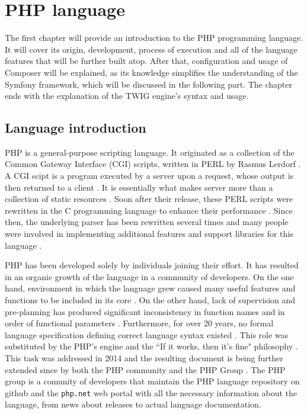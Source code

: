 \chapter{PHP language}
The first chapter will provide an introduction to the PHP programming language. It will cover its origin, development, process of execution and all of the language features that will be further built atop. After that, configuration and usage of Composer will be explained, as its knowledge simplifies the understanding of the Symfony framework, which will be discussed in the following part. The chapter ends with the explanation of the TWIG engine's syntax and usage. 

\section{Language introduction}
PHP is a general-purpose scripting language. It originated as a collection of the Common Gateway Interface (CGI) scripts, written in PERL by Rasmus Lerdorf \citep{modern.php}. A CGI scipt is a program executed by a server upon a request, whose output is then returned to a client \citep{cgi.perl}. It is essentially what makes server more than a collection of static resources \citep{cgi.perl}. Soon after their release, these PERL scripts were rewritten in the C programming language to enhance their performance \citep{modern.php}. Since then, the underlying parser has been rewritten several times and many people were involved in implementing additional features and support libraries for this language \citep{php.manual}. 

PHP has been developed solely by individuals joining their effort. It has resulted in an organic growth of the language in a community of developers. On the one hand, environment in which the language grew caused many useful features and functions to be included in its core \citep{php.manual}. On the other hand, lack of supervision and pre-planning has produced significant inconsistency in function names and in order of functional parameters \citep{php.manual}. Furthermore, for over 20 years, no formal language specification defining correct language syntax existed \citep{Oscon2014}. This role was substituted by the PHP's engine and the ``If it works, then it's fine" philosophy \citep{Oscon2014}. This task was addressed in 2014 and the resulting document is being further extended since by both the PHP community and the PHP Group \citep{Oscon2014, php.spec}. The PHP group is a comunity of developers that maintain the PHP language repository on github and the \texttt{php.net} web portal with all the necessary information about the language, from news about releases to actual language documentation.


